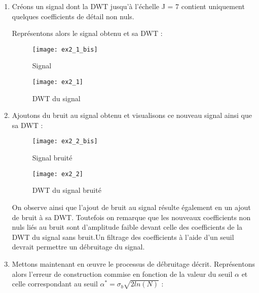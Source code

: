 \documentclass[12pt,a4paper,titlepage]{article}
\begin{document}
    \begin{enumerate}
        \item{Créons un signal dont la DWT jusqu'à l'échelle  J = 7 contient
                uniquement quelques coefficients de détail non nuls.

                Représentons alors le signal obtenu et sa DWT :

                \begin{figure}[H]
                    \caption{Signal}
                    \texttt{[image: ex2\_1\_bis]}
                    \centering
                \end{figure}

                \begin{figure}[H]
                    \caption{DWT du signal}
                    \texttt{[image: ex2\_1]}
                    \centering
                \end{figure}
            }

        \item{Ajoutons du bruit au signal obtenu et visualisons ce nouveau
                signal ainsi que sa DWT :

                \begin{figure}[H]
                    \caption{Signal bruité}
                    \texttt{[image: ex2\_2\_bis]}
                    \centering
                \end{figure}

                \begin{figure}[H]
                    \caption{DWT du signal bruité}
                    \texttt{[image: ex2\_2]}
                    \centering
                \end{figure}

                On observe ainsi que l'ajout de bruit au signal résulte
                également en un ajout de bruit à sa DWT. Toutefois on
                remarque que les nouveaux coefficients non nuls liés au
                bruit sont d'amplitude faible devant celle des coefficients
                de la DWT du signal sans bruit.Un filtrage des coefficients
                à l'aide d'un seuil devrait permettre un débruitage du signal.
            }

        \item{Mettons maintenant en œuvre le processus de débruitage décrit.
                Représentons alors l'erreur de construction commise en fonction
                de la valeur du seuil $\alpha$ et celle correspondant au seuil
                $\alpha^* = \sigma_b \sqrt{2 ln(N)}$ :

}
\end{enumerate}
\end{document}
